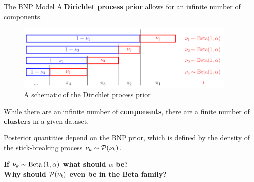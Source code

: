 \begin{frame}{The BNP Model \citep{sethuraman:1994:constructivedp}}
A {\bf Dirichlet process prior} allows for an infinite number of components.
\vspace{-0.2em}
\begin{figure}[!h]
\centering
\includegraphics[width = 0.95\textwidth]{./static_figures/DP_stick_breaking.png}
\caption{A schematic of the Dirichlet process prior}
\end{figure}
\vspace{-0.2in}

While there are an infinite number of {\bf components}, there are a finite number of {\bf clusters} in a given dataset. 

Posterior quantities depend on the BNP prior, which is defined 
by the density of the stick-breaking process $\nu_{k} \sim \mathcal{P}(\nu_{k})$.








\vspace{1em}

\begin{mdframed}[style=MyFrame]
\begin{center}
{\bf If $\nu_{k} \sim \mathrm{Beta}\left(1, \alpha\right)$ what should $\alpha$ be?\\}
{\bf Why should $\mathcal{P}(\nu_{k})$ even be in the Beta family?}
\end{center}
\end{mdframed}

\end{frame}
